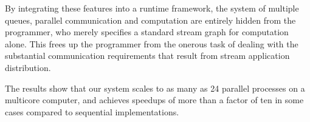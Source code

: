 \documentclass[10pt, conference, compsocconf, reqno]{IEEEtran}
\begin{document}
By integrating these features into a runtime framework, the system of multiple queues, parallel communication and computation are entirely hidden from the programmer, who merely specifies a standard stream graph for computation alone. This frees up the programmer from the onerous task of dealing with the substantial communication requirements that result from stream application distribution.

The results show that our system scales to as many as 24 parallel processes on a multicore computer, and achieves speedups of more than a factor of ten in some cases compared to sequential implementations.

%
%



%
%
\end{document}
